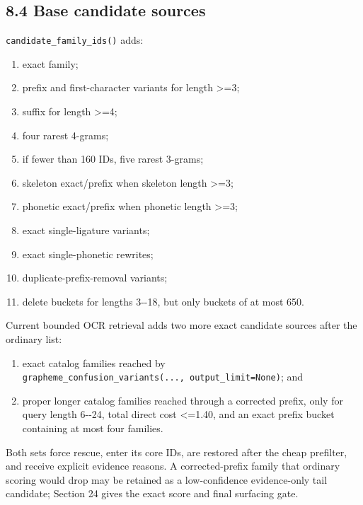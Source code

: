 \subsection{8.4 Base candidate sources}\label{84-base-candidate-sources}

\texttt{candidate\_\allowbreak{}family\_\allowbreak{}ids()} adds:

\begin{enumerate}
\def\labelenumi{\arabic{enumi}.}
\tightlist
\item
  exact family;
\item
  prefix and first-character variants for length \textgreater=3;
\item
  suffix for length \textgreater=4;
\item
  four rarest 4-grams;
\item
  if fewer than 160 IDs, five rarest 3-grams;
\item
  skeleton exact/prefix when skeleton length \textgreater=3;
\item
  phonetic exact/prefix when phonetic length \textgreater=3;
\item
  exact single-ligature variants;
\item
  exact single-phonetic rewrites;
\item
  duplicate-prefix-removal variants;
\item
  delete buckets for lengths 3-\/-18, but only buckets of at most 650.
\end{enumerate}

Current bounded OCR retrieval adds two more exact candidate sources after the ordinary list:

\begin{enumerate}
\def\labelenumi{\arabic{enumi}.}
\setcounter{enumi}{11}
\tightlist
\item
  exact catalog families reached by \texttt{grapheme\_\allowbreak{}confusion\_\allowbreak{}variants(...,\ output\_\allowbreak{}limit=None)}; and
\item
  proper longer catalog families reached through a corrected prefix, only for query length 6-\/-24, total direct cost \textless=1.40, and an exact prefix bucket containing at most four families.
\end{enumerate}

Both sets force rescue, enter its core IDs, are restored after the cheap prefilter, and receive explicit evidence reasons. A corrected-prefix family that ordinary scoring would drop may be retained as a low-confidence evidence-only tail candidate; Section 24 gives the exact score and final surfacing gate.

